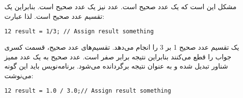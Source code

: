 \section{}
\paragraph{}\label{answer:27}
مشکل این است که  یک عدد صحیح است. عدد  نیز یک عدد صحیح است. بنابراین  یک تقسیم عدد صحیح است. لذا عبارت:
\begin{LTR}
    \begin{lstlisting}[style=C++Style]
        12 result = 1/3; // Assign result something
    \end{lstlisting}
\end{LTR}

یک تقسیم عدد صحیح 1 بر 3 را انجام می‌دهد. تقسیم‌های عدد صحیح، قسمت کسری جواب را قطع می‌کنند بنابراین نتیجه برابر صفر است. عدد صحیح  به یک عدد ممیز شناور تبدیل شده و به عنوان نتیجه برگردانده می‌شود. برنامه‌نویس باید این گونه می‌نوشت:
\begin{LTR}
    \begin{lstlisting}[style=C++Style]
        12 result = 1.0 / 3.0;// Assign result something
    \end{lstlisting}
\end{LTR}
